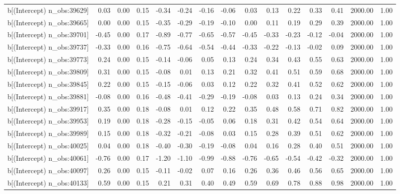 \begin{table}[ht]
\begin{tabular}{rrrrrrrrrrrrrrr}
  b[(Intercept) n\_obs:39629] & 0.03 & 0.00 & 0.15 & -0.34 & -0.24 & -0.16 & -0.06 & 0.03 & 0.13 & 0.22 & 0.33 & 0.41 & 2000.00 & 1.00 \\ 
  b[(Intercept) n\_obs:39665] & 0.00 & 0.00 & 0.15 & -0.35 & -0.29 & -0.19 & -0.10 & 0.00 & 0.11 & 0.19 & 0.29 & 0.39 & 2000.00 & 1.00 \\ 
  b[(Intercept) n\_obs:39701] & -0.45 & 0.00 & 0.17 & -0.89 & -0.77 & -0.65 & -0.57 & -0.45 & -0.33 & -0.23 & -0.12 & -0.04 & 2000.00 & 1.00 \\ 
  b[(Intercept) n\_obs:39737] & -0.33 & 0.00 & 0.16 & -0.75 & -0.64 & -0.54 & -0.44 & -0.33 & -0.22 & -0.13 & -0.02 & 0.09 & 2000.00 & 1.00 \\ 
  b[(Intercept) n\_obs:39773] & 0.24 & 0.00 & 0.15 & -0.14 & -0.06 & 0.05 & 0.13 & 0.24 & 0.34 & 0.43 & 0.55 & 0.63 & 2000.00 & 1.00 \\ 
  b[(Intercept) n\_obs:39809] & 0.31 & 0.00 & 0.15 & -0.08 & 0.01 & 0.13 & 0.21 & 0.32 & 0.41 & 0.51 & 0.59 & 0.68 & 2000.00 & 1.00 \\ 
  b[(Intercept) n\_obs:39845] & 0.22 & 0.00 & 0.15 & -0.15 & -0.06 & 0.03 & 0.12 & 0.22 & 0.32 & 0.41 & 0.52 & 0.62 & 2000.00 & 1.00 \\ 
  b[(Intercept) n\_obs:39881] & -0.08 & 0.00 & 0.16 & -0.48 & -0.41 & -0.29 & -0.19 & -0.08 & 0.03 & 0.13 & 0.24 & 0.34 & 2000.00 & 1.00 \\ 
  b[(Intercept) n\_obs:39917] & 0.35 & 0.00 & 0.18 & -0.08 & 0.01 & 0.12 & 0.22 & 0.35 & 0.48 & 0.58 & 0.71 & 0.82 & 2000.00 & 1.00 \\ 
  b[(Intercept) n\_obs:39953] & 0.19 & 0.00 & 0.18 & -0.28 & -0.15 & -0.05 & 0.06 & 0.18 & 0.31 & 0.42 & 0.54 & 0.64 & 2000.00 & 1.00 \\ 
  b[(Intercept) n\_obs:39989] & 0.15 & 0.00 & 0.18 & -0.32 & -0.21 & -0.08 & 0.03 & 0.15 & 0.28 & 0.39 & 0.51 & 0.62 & 2000.00 & 1.00 \\ 
  b[(Intercept) n\_obs:40025] & 0.04 & 0.00 & 0.18 & -0.40 & -0.30 & -0.19 & -0.08 & 0.04 & 0.16 & 0.28 & 0.40 & 0.51 & 2000.00 & 1.00 \\ 
  b[(Intercept) n\_obs:40061] & -0.76 & 0.00 & 0.17 & -1.20 & -1.10 & -0.99 & -0.88 & -0.76 & -0.65 & -0.54 & -0.42 & -0.32 & 2000.00 & 1.00 \\ 
  b[(Intercept) n\_obs:40097] & 0.26 & 0.00 & 0.15 & -0.11 & -0.02 & 0.07 & 0.16 & 0.26 & 0.36 & 0.46 & 0.56 & 0.65 & 2000.00 & 1.00 \\ 
  b[(Intercept) n\_obs:40133] & 0.59 & 0.00 & 0.15 & 0.21 & 0.31 & 0.40 & 0.49 & 0.59 & 0.69 & 0.78 & 0.88 & 0.98 & 2000.00 & 1.00 \\ 

\end{tabular}
\end{table}
